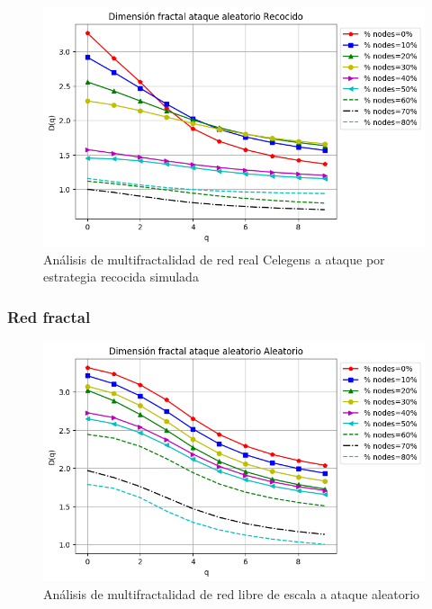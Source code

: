 \begin{figure}[H]
    \centering
    \includegraphics[scale=0.7]{Capitulo6MultifractalidadYRobustez/imagenes/grafica_DqSimulated20180508_020345Celengs.png}
    \caption{Análisis de multifractalidad de red real Celegens a ataque por estrategia recocida simulada }
\end{figure}

\subsubsection{Red fractal}
\begin{figure}[H]
    \centering
    \includegraphics[scale=0.7]{Capitulo6MultifractalidadYRobustez/imagenes/grafica_DqRandom20180501_151350floweru1v3.png}
    \caption{Análisis de multifractalidad de red libre de escala a ataque aleatorio }
\end{figure}

